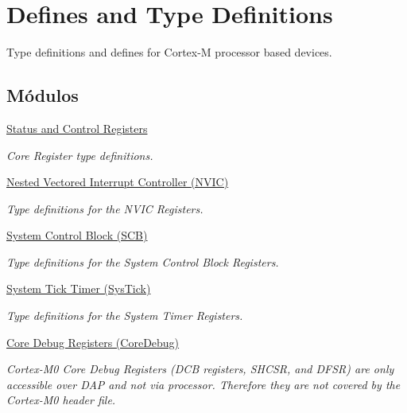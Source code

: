 \hypertarget{group___c_m_s_i_s__core__register}{}\section{Defines and Type Definitions}
\label{group___c_m_s_i_s__core__register}


Type definitions and defines for Cortex-\/M processor based devices.  


\subsection*{Módulos}
\begin{DoxyCompactItemize}
\item 
\hyperlink{group___c_m_s_i_s___c_o_r_e}{Status and Control Registers}
\begin{DoxyCompactList}\small\item\em Core Register type definitions. \end{DoxyCompactList}\item 
\hyperlink{group___c_m_s_i_s___n_v_i_c}{Nested Vectored Interrupt Controller (\+N\+V\+I\+C)}
\begin{DoxyCompactList}\small\item\em Type definitions for the N\+V\+IC Registers. \end{DoxyCompactList}\item 
\hyperlink{group___c_m_s_i_s___s_c_b}{System Control Block (\+S\+C\+B)}
\begin{DoxyCompactList}\small\item\em Type definitions for the System Control Block Registers. \end{DoxyCompactList}\item 
\hyperlink{group___c_m_s_i_s___sys_tick}{System Tick Timer (\+Sys\+Tick)}
\begin{DoxyCompactList}\small\item\em Type definitions for the System Timer Registers. \end{DoxyCompactList}\item 
\hyperlink{group___c_m_s_i_s___core_debug}{Core Debug Registers (\+Core\+Debug)}
\begin{DoxyCompactList}\small\item\em Cortex-\/\+M0 Core Debug Registers (D\+CB registers, S\+H\+C\+SR, and D\+F\+SR) are only accessible over D\+AP and not via processor. Therefore they are not covered by the Cortex-\/\+M0 header file. \end{DoxyCompactList}\item 

\end{DoxyCompactItemize}
